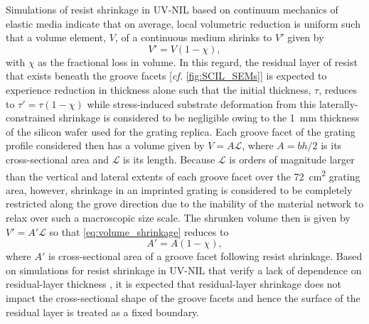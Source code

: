 Simulations of resist shrinkage in UV-NIL based on continuum mechanics of elastic media \cite{Shibata10,Horiba_2012} indicate that on average, local volumetric reduction is uniform such that a volume element, $V$, of a continuous medium shrinks to $V'$ given by 
\begin{equation}\label{eq:volume_shrinkage}
 V' = V \left( 1 - \chi \right) ,
 \end{equation}
with $\chi$ as the fractional loss in volume. 
In this regard, the residual layer of resist that exists beneath the groove facets [\emph{cf.\@} \cref{fig:SCIL_SEMs}] is expected to experience reduction in thickness alone such that the initial thickness, $\tau$, reduces to $\tau' = \tau \left( 1 - \chi \right)$ while stress-induced substrate deformation from this laterally-constrained shrinkage is considered to be negligible owing to the \SI{1}{\mm} thickness of the silicon wafer used for the grating replica. 
Each groove facet of the grating profile considered then has a volume given by $V = A \mathcal{L}$, where $A = b h / 2$ is its cross-sectional area and $\mathcal{L}$ is its length. 
Because $\mathcal{L}$ is orders of magnitude larger than the vertical and lateral extents of each groove facet over the \SI{72}{\cm\squared} grating area, however, shrinkage in an imprinted grating is considered to be completely restricted along the grove direction due to the inability of the material network to relax over such a macroscopic size scale. 
The shrunken volume then is given by $V' = A' \mathcal{L}$ so that \cref{eq:volume_shrinkage} reduces to 
\begin{equation}\label{eq:area_shrinkage}
 A' = A \left( 1 - \chi \right) , 
 \end{equation}
where $A'$ is cross-sectional area of a groove facet following resist shrinkage. 
Based on simulations for resist shrinkage in UV-NIL that verify a lack of dependence on residual-layer thickness \cite{Horiba_2012}, it is expected that residual-layer shrinkage does not impact the cross-sectional shape of the groove facets and hence the surface of the residual layer is treated as a fixed boundary. 

